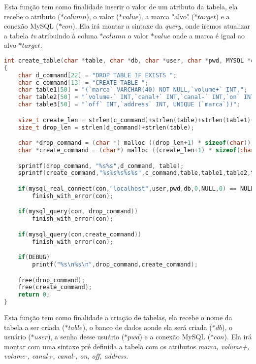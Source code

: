 Esta fun\c{c}\~{a}o tem como finalidade inserir o valor de um atributo da
tabela, ela recebe o atributo (\textit{$*column$}), o valor (\textit{$*value$}),
a marca "alvo" (\textit{$*target$}) e a conex\~{a}o MySQL (\textit{$*con$}). Ela
ir\'{a} montar a sintaxe da \textit{query}, onde iremos atualizar a tabela
\textit{tv} atribuindo \`{a} coluna \textit{$*column$} o valor \textit{$*value$}
onde a marca \'{e} igual ao alvo \textit{$*target$}.

\begin{lstlisting}[language=c, caption={fun\c{c}\~{a}o $create\_table()$}, label={lst:dbphi4}]
int create_table(char *table, char *db, char *user, char *pwd, MYSQL *con)
{
	char d_command[22] = "DROP TABLE IF EXISTS ";
	char c_command[13] = "CREATE TABLE ";
	char table1[50] = "(`marca` VARCHAR(40) NOT NULL,`volume+` INT,";
	char table2[50] = "`volume-` INT,`canal+` INT,`canal-` INT,`on` INT,";
	char table3[50] = "`off` INT,`address` INT, UNIQUE (`marca`))";

	size_t create_len = strlen(c_command)+strlen(table)+strlen(table1)+strlen(table2)+strlen(table3);
	size_t drop_len = strlen(d_command)+strlen(table);

	char *drop_command = (char *) malloc ((drop_len+1) * sizeof(char));
	char *create_command = (char*) malloc ((create_len+1) * sizeof(char));

	sprintf(drop_command, "%s%s",d_command, table);
	sprintf(create_command,"%s%s%s%s%s",c_command,table,table1,table2,table3);

	if(mysql_real_connect(con,"localhost",user,pwd,db,0,NULL,0) == NULL)
		finish_with_error(con);

	if(mysql_query(con, drop_command))
		finish_with_error(con);

	if(mysql_query(con,create_command))
		finish_with_error(con);

	if(DEBUG)
		printf("%s\n%s\n",drop_command,create_command);

	free(drop_command);
	free(create_command);
	return 0;
}
\end{lstlisting}

Esta fun\c{c}\~{a}o tem como finalidade a cria\c{c}\~{a}o de tabelas, ela recebe
o nome da tabela a ser criada (\textit{$*table$}), o banco de dados aonde ela
ser\'{a} criada (\textit{$*db$}), o usu\'{a}rio (\textit{$*user$}), a senha
desse usu\'{a}rio (\textit{$*pwd$}) e a conex\~{a}o MySQL (\textit{$*con$}). Ela
ir\'{a} montar com uma sintaxe pr\'{e} definida a tabela com os atributos
\textit{marca, volume+, volume-, canal+, canal-, on, off, address}.


